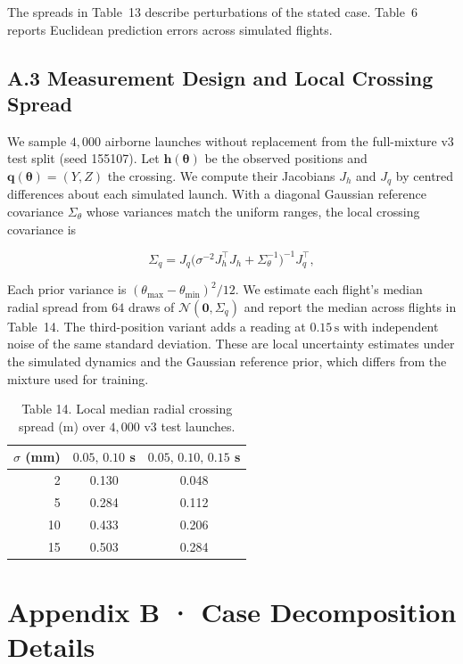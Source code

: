 The spreads in Table~13 describe perturbations of the stated case. Table~6 reports Euclidean prediction errors across simulated flights.

\subsection*{A.3 Measurement Design and Local Crossing Spread}

We sample $4{,}000$ airborne launches without replacement from the full-mixture v3 test split (seed 155107). Let $\mathbf h(\boldsymbol\theta)$ be the observed positions and $\mathbf q(\boldsymbol\theta)=(Y,Z)$ the crossing. We compute their Jacobians $J_h$ and $J_q$ by centred differences about each simulated launch. With a diagonal Gaussian reference covariance $\Sigma_\theta$ whose variances match the uniform ranges, the local crossing covariance is

$$
\Sigma_q=J_q
  \bigl(\sigma^{-2}J_h^\top J_h+\Sigma_\theta^{-1}\bigr)^{-1}
  J_q^\top ,
$$

Each prior variance is $(\theta_{\max}-\theta_{\min})^2/12$. We estimate each flight's median radial spread from $64$ draws of $\mathcal N(\mathbf 0,\Sigma_q)$ and report the median across flights in Table~14. The third-position variant adds a reading at $0.15\,\mathrm{s}$ with independent noise of the same standard deviation. These are local uncertainty estimates under the simulated dynamics and the Gaussian reference prior, which differs from the mixture used for training.

\begin{table}[H]
  
  
  \caption{Table 14. Local median radial crossing spread (m) over $4{,}000$ v3 test launches.}
  \begin{tabular}{rcc}
    \toprule
    $\sigma$ (mm) & $0.05,\,0.10$ s & $0.05,\,0.10,\,0.15$ s \\
    \midrule
    2  & 0.130 & 0.048 \\
    5  & 0.284 & 0.112 \\
    10 & 0.433 & 0.206 \\
    15 & 0.503 & 0.284 \\
    \bottomrule
  \end{tabular}
\end{table}

\section*{Appendix B · Case Decomposition Details}

